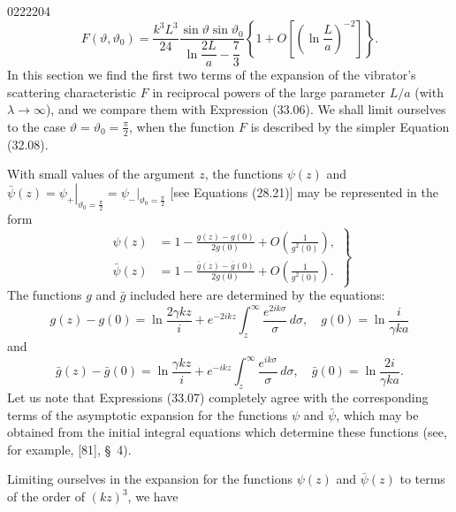 \begin{scanpage}{0222}{204}
\[F(\vartheta,\vartheta_0)=\frac{k^3L^3}{24}\frac{\sin\vartheta\sin\vartheta_0}{\ln\dfrac{2L}a-\dfrac73}\left\{1+O\left[\left(\ln\frac La\right)^{-2}\right]\right\}.\tag{33.06}\]
In this section we find the first two terms of the expansion of the vibrator's scattering characteristic $F$ in reciprocal powers of the large parameter $L/a$ (with $\lambda\to\infty$), and we compare them with Expression (33.06). We shall limit ourselves to the case $\vartheta=\vartheta_0=\frac\pi2$, when the function $F$ is described by the simpler Equation (32.08).

With small values of the argument $z$, the functions $\psi(z)$ and $\bar\psi(z)=\left.\psi_+\right|_{\vartheta_0=\frac\pi2}=\left.\psi_-\right|_{\vartheta_0=\frac\pi2}$ [see Equations (28.21)] may be represented in the form
\[\left.\begin{aligned}
\psi(z)&=1-\frac{g(z)-g(0)}{2g(0)}+O\left(\frac1{g^2(0)}\right),\\
\bar\psi(z)&=1-\frac{\bar g(z)-\bar g(0)}{2g(0)}+O\left(\frac1{g^2(0)}\right).
\end{aligned}\right\}\tag{33.07}\]
The functions $g$ and $\bar g$ included here are determined by the equations:
\[g(z)-g(0)=\ln\frac{2\gamma kz}i+e^{-2ikz}\int_z^\infty\frac{e^{2ik\sigma}}\sigma\,d\sigma,\quad g(0)=\ln\frac{i}{\gamma ka}\tag{33.08}\]
and
\[\bar g(z)-\bar g(0)=\ln\frac{\gamma kz}i+e^{-ikz}\int_z^\infty\frac{e^{ik\sigma}}\sigma\,d\sigma,\quad\bar g(0)=\ln\frac{2i}{\gamma ka}.\tag{33.09}\]
Let us note that Expressions (33.07) completely agree with the corresponding terms of the asymptotic expansion for the functions $\psi$ and $\bar\psi$, which may be obtained from the initial integral equations which determine these functions (see, for example, [81], \S\ 4).

Limiting ourselves in the expansion for the functions $\psi(z)$ and $\bar\psi(z)$ to terms of the order of $(kz)^3$, we have
\end{scanpage}
